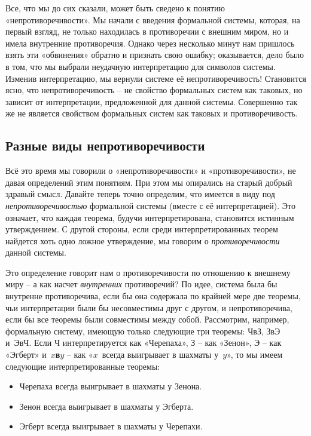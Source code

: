 \documentclass[../main.tex]{subfiles}
\begin{document}
Все, что мы до сих сказали, может быть сведено к понятию «непротиворечивости». Мы начали с введения формальной системы, которая, на первый взгляд, не только находилась в противоречии с внешним миром, но и имела внутренние противоречия. Однако через несколько минут нам пришлось взять эти «обвинения» обратно и признать свою ошибку; оказывается, дело было в том, что мы выбрали неудачную интерпретацию для символов системы. Изменив интерпретацию, мы вернули системе её непротиворечивость! Становится ясно, что непротиворечивость \--- не свойство формальных систем как таковых, но зависит от интерпретации, предложенной для данной системы. Совершенно так же не является свойством формальных систем как таковых и противоречивость.


\subsection{Разные виды непротиворечивости}

Всё это время мы говорили о «непротиворечивости» и «противоречивости», не давая определений этим понятиям. При этом мы опирались на старый добрый здравый смысл. Давайте теперь точно определим, что имеется в виду под \emph{непротиворечивостью} формальной системы (вместе с её интерпретацией). Это означает, что каждая теорема, будучи интерпретирована, становится истинным утверждением. С другой стороны, если среди интерпретированных теорем найдется хоть одно ложное утверждение, мы говорим о \emph{противоречивости} данной системы.

Это определение говорит нам о противоречивости по отношению к внешнему миру \--- а как насчет \emph{внутренних} противоречий? По идее, система была бы внутренне противоречива, если бы она содержала по крайней мере две теоремы, чьи интерпретации были бы несовместимы друг с другом, и непротиворечива, если бы все теоремы были совместимы между собой. Рассмотрим, например, формальную систему, имеющую только следующие три теоремы: ЧвЗ, ЗвЭ и~ЭвЧ\@. Если Ч интерпретируется как «Черепаха», З \--- как «Зенон», Э \--- как «Эгберт» и~\textbf{$x$в$y$} \--- как «$x$~всегда выигрывает в шахматы у~$y$», то мы имеем следующие интерпретированные теоремы:
%
\begin{itemize}[label={}, noitemsep, topsep=6pt]
    \item Черепаха всегда выигрывает в шахматы у Зенона.

    \item Зенон всегда выигрывает в шахматы у Эгберта.

    \item Эгберт всегда выигрывает в шахматы у Черепахи.
\end{itemize}
\end{document}
